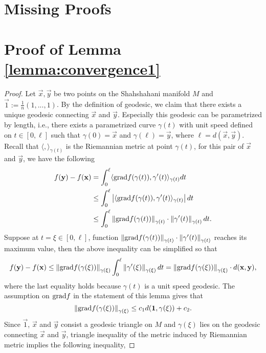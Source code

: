\section{Missing Proofs}

\section{Proof of Lemma \ref{lemma:convergence1}}

\begin{proof}
Let $\vec{x},\vec{y}$ be two points on the Shahshahani manifold $M$ and $\vec{1}:=\frac{1}{n}(1,...,1)$. By the definition of geodesic, we claim that there exists a unique geodesic connecting $\vec{x}$ and $\vec{y}$. Especially this geodesic can be parametrized by length, i.e., there exists a parametrized curve $\gamma(t)$ with unit speed defined on $t\in[0,\ell]$ such that $\gamma(0)=\vec{x}$ and $\gamma(\ell)=\vec{y}$, where $\ell = d(\vec{x},\vec{y})$. Recall that $\langle,\rangle_{\gamma(t)}$ is the Riemannian metric at point $\gamma(t)$, for this pair of $\vec{x}$ and $\vec{y}$, we have the following
\begin{equation}
\begin{split}
f(\mathbf{y})-f(\mathbf{x})&=\int_0^{\ell}\langle\mathrm{grad} f(\gamma(t)),\gamma'(t)\rangle_{\gamma(t)}dt
\\
&\le \int_0^{\ell}\left|\langle\mathrm{grad} f(\gamma(t)),\gamma'(t)\rangle_{\gamma(t)}\right|dt
\\
&\le\int_0^{\ell}\left\Vert \mathrm{grad} f(\gamma(t)) \right\Vert_{\gamma(t)}\cdot\left\Vert \gamma'(t) \right\Vert_{\gamma(t)}dt.
\end{split}
\end{equation}
Suppose at $t=\xi\in[0,\ell]$, function $\left\Vert \mathrm{grad} f(\gamma(t)) \right\Vert_{\gamma(t)}\cdot\left\Vert \gamma'(t) \right\Vert_{\gamma(t)}$ reaches its maximum value, then the above inequality can be simplified so that
\begin{equation}\label{eq:MVT}
f(\mathbf{y})-f(\mathbf{x})\le\left\Vert \mathrm{grad} f(\gamma(\xi)) \right\Vert_{\gamma(\xi)}\int_0^{\ell}\left\Vert \gamma'(\xi) \right\Vert_{\gamma(\xi)}dt=\left\Vert \mathrm{grad} f(\gamma(\xi)) \right\Vert_{\gamma(\xi)}\cdot d(\mathbf{x},\mathbf{y}),
\end{equation}
where the last equality holds because $\gamma(t)$ is a unit speed geodesic. The assumption on $\mathrm{grad} f$ in the statement of this lemma gives that
\[
\left\Vert \mathrm{grad} f(\gamma(\xi)) \right\Vert_{\gamma(\xi)}\le c_1d(\mathbf{1},\gamma(\xi))+c_2.
\]
Since $\vec{1}$, $\vec{x}$ and $\vec{y}$ consist a geodesic triangle on $M$ and $\gamma(\xi)$ lies on the geodesic connecting $\vec{x}$ and $\vec{y}$, triangle inequality of the metric induced by Riemannian metric implies the following inequality,

\end{proof}
